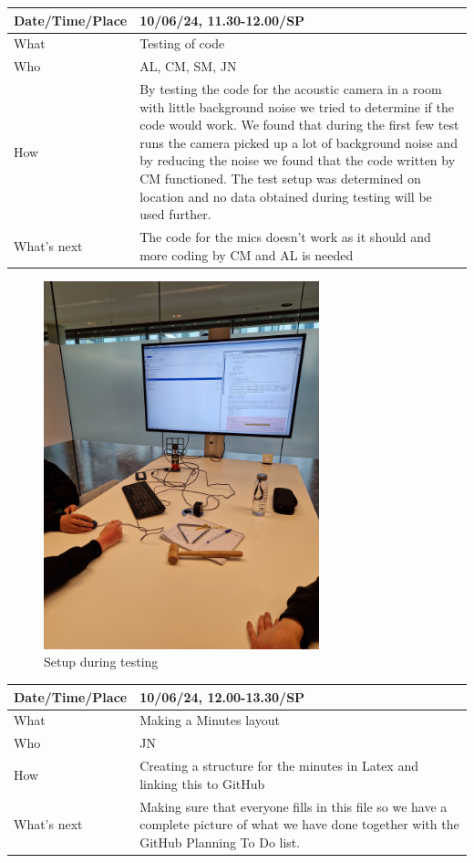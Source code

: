 \documentclass{article}
\begin{document}
\begin{table}[H]
\begin{tabular}{|p{1.5in}|p{4in}|}
\hline
Date/Time/Place & 10/06/24, 11.30-12.00/SP \\ \hline
What            &  Testing of code\\ \hline
Who             &  AL, CM, SM, JN\\ \hline
How             &  By testing the code for the acoustic camera in a room with little background noise we tried to determine if the code would work. We found that during the first few test runs the camera picked up a lot of background noise and by reducing the noise we found that the code written by CM functioned. The test setup was determined on location and no data obtained during testing will be used further. \\ \hline
What's next     &  The code for the mics doesn't work as it should and more coding by CM and AL is needed\\ \hline
\end{tabular}
\end{table}
\begin{figure}[H]
    \centering
    \includegraphics[width=8cm, angle =270]{20240610_113743.jpg}
    \caption{Setup during testing}   
\end{figure}


\begin{table}[H]
\begin{tabular}{|p{1.5in}|p{4in}|}
\hline
Date/Time/Place &  10/06/24, 12.00-13.30/SP\\ \hline
What            &  Making a Minutes layout\\ \hline
Who             &  JN\\ \hline
How             &  Creating a structure for the minutes in Latex and linking this to GitHub\\ \hline
What's next     &  Making sure that everyone fills in this file so we have a complete picture of what we have done together with the GitHub Planning To Do list.\\ \hline
\end{tabular}
\end{table}
\end{document}
